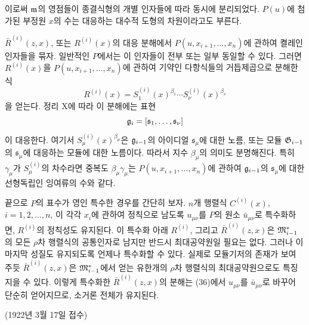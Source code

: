 이로써 \(\mathfrak m\)의 영점들이 종결식형의 개별 인자들에 따라 동시에 분리되었다. \(P(u)\)에 첨가된 부정원 \(x\)의 수는 대응하는 대수적 도형의 차원이라고도 부른다.

\(\bar R^{(i)}(z,x)\), 또는 \(R^{(i)}(x)\)의 대응 분해에서 \(P(u,x_{i+1},\ldots,x_n)\)에 관하여 켤레인 인자들을 묶자. 일반적인 \(P\)에서는 이 인자들이 전부 또는 일부 동일할 수 있다. 그러면 \(R^{(i)}(x)\)을 \(P(u,x_{i+1},\ldots,x_n)\)에 관하여 기약인 다항식들의 거듭제곱으로 분해한 식
\[
R^{(i)}(x)=S_1^{(i)}(x)^{\beta_1}\cdots
S_\nu^{(i)}(x)^{\beta_\nu}
\]
을 얻는다. 정리 X에 따라 이 분해에는 표현
\[
\mathfrak g_i=[\mathfrak s_1,\ldots,\mathfrak s_\nu]
\]
이 대응한다. 여기서 \(S_\mu^{(i)}(x)^{\beta_\mu}\)은 \(\mathfrak g_{i-1}\)의 아이디얼 \(\mathfrak s_\mu\)에 대한 노름, 또는 모듈 \(\mathfrak G_{i-1}\)의 \(\mathfrak s_\mu\)에 대응하는 모듈에 대한 노름이다. 따라서 지수 \(\beta_\mu\)의 의미도 분명해진다. 특히 \(\gamma_\mu\)가 \(S_\mu^{(i)}\)의 차수라면 중복도 \(\beta_\mu\gamma_\mu\)는 \(P(u,x_{i+1},\ldots,x_n)\)에 관하여 \(\mathfrak g_{i-1}\)의 \(\mathfrak s_\mu\)에 대한 선형독립인 잉여류의 수와 같다.

끝으로 \(P\)의 표수가 영인 특수한 경우를 간단히 보자. \(n\)개 행렬식 \(C^{(i)}(x)\), \(i=1,2,\ldots,n\), 이 각각 \(x_i\)에 관하여 정칙으로 남도록 \(u_{\mu\nu}\)를 \(P\)의 원소 \(\bar u_{\mu\nu}\)로 특수화하면, \(R^{(i)}\)의 정칙성도 유지된다. 이 특수화 아래 \(R^{(i)}\), 그리고 \(\bar R^{(i)}(z,x)\)은 \(\mathfrak M^*_{i-1}\)의 모든 \(\rho\)차 행렬식의 공통인자로 남지만 반드시 최대공약원일 필요는 없다. 그러나 이 마지막 성질도 유지되도록 언제나 특수화할 수 있다. 실제로 모듈기저의 존재가 보여 주듯 \(\bar R^{(i)}(z,x)\)은 \(\mathfrak M^*_{i-1}\)에서 얻는 유한개의 \(\rho\)차 행렬식의 최대공약원으로도 특징지을 수 있다. 이렇게 특수화한 \(\bar R^{(i)}(z,x)\)의 분해는 (36)에서 \(u_{\mu\nu}\)를 \(\bar u_{\mu\nu}\)로 바꾸어 단순히 얻어지므로, 소거론 전체가 유지된다.

\begin{center}
(1922년 3월 17일 접수)
\end{center}
